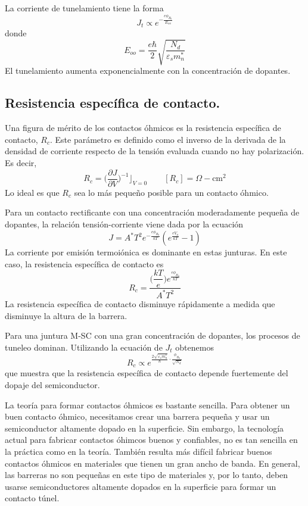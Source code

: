 \documentclass[12pt,a4paper]{article}
\begin{document}
La corriente de tunelamiento tiene la forma
\[ J_{t} \propto e^{-\frac{e \phi _{B_{0}}}{E_{oo}}} \]
donde
\[ E_{oo}=\frac{e \hbar}{2} \sqrt{\frac{N_{d}}{\varepsilon _{s} m_{n}^{\ast}}} \]
El tunelamiento aumenta exponencialmente con la concentración de dopantes.

\subsection{Resistencia específica de contacto.}

Una figura de mérito de los contactos óhmicos es la resistencia específica de contacto, $R_{c}$. Este parámetro es definido como el inverso de la derivada de la densidad de corriente respecto de la tensión evaluada cuando no hay polarización. Es decir,
\[ R_{c} = \bigg( \frac{\partial J}{\partial V} \bigg)^{-1} \rfloor_{V=0} \qquad [R_{c}]=\Omega-\textrm{cm}^{2} \]
Lo ideal es que $R_{c}$ sea lo más pequeño posible para un contacto óhmico.

Para un contacto rectificante con una concentración moderadamente pequeña de dopantes, la relación tensión-corriente viene dada por la ecuación
\[ J=A^{\ast}T^{2}e^{-\frac{e\phi _{B_{0}}}{kT}} (e^{\frac{eV_{a}}{kT}} -1)\]
La corriente por emisión termoiónica es dominante en estas junturas. En este caso, la resistencia específica de contacto es
\[ R_{c}=\frac{\bigg( \dfrac{kT}{e} \bigg) e^{\frac{e \phi _{B_{0}}}{kT}}}{A^{\ast}T^{2}} \]
La resistencia específica de contacto disminuye rápidamente a medida que disminuye la altura de la barrera.

Para una juntura M-SC con una gran concentración de dopantes, los procesos de tuneleo dominan. Utilizando la ecuación de $J_{t}$ obtenemos
\[ R_{c} \propto e^{\frac{2\sqrt{\varepsilon_{s}m^{\ast}_{n}}}{\hbar} \cdot \frac{\phi _{B_{0}}}{\sqrt{N_{d}}}} \]
que muestra que la resistencia específica de contacto depende fuertemente del dopaje del semiconductor.

La teoría para formar contactos óhmicos es bastante sencilla. Para obtener un buen contacto óhmico, necesitamos crear una barrera pequeña y usar un semiconductor altamente dopado en la superficie. Sin embargo, la tecnología actual para fabricar contactos óhimcos buenos y confiables, no es tan sencilla en la práctica como en la teoría. También resulta más difícil fabricar buenos contactos óhmicos en materiales que tienen un gran ancho de banda. En general, las barreras no son pequeñas en este tipo de materiales y, por lo tanto, deben usarse semiconductores altamente dopados en la superficie para formar un contacto túnel.
\end{document}
